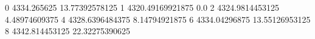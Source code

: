 0 4334.265625 13.77392578125
1 4320.49169921875 0.0
2 4324.9814453125 4.48974609375
4 4328.6396484375 8.14794921875
6 4334.04296875 13.55126953125
8 4342.814453125 22.32275390625
